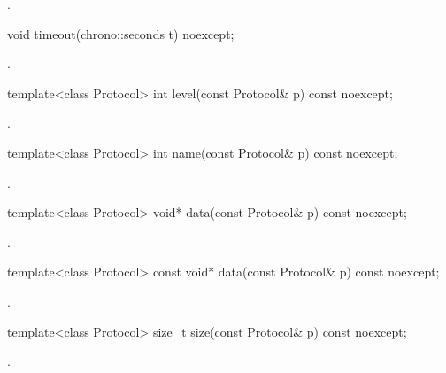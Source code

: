 \begin{itemdescr}
\pnum
\returns {}.
\end{itemdescr}

\begin{itemdecl}
void timeout(chrono::seconds t) noexcept;
\end{itemdecl}

\begin{itemdescr}
\pnum
\postconditions {}.
\end{itemdescr}

\begin{itemdecl}
template<class Protocol> int level(const Protocol& p) const noexcept;
\end{itemdecl}

\begin{itemdescr}
\pnum
\returns {}.
\end{itemdescr}

\begin{itemdecl}
template<class Protocol> int name(const Protocol& p) const noexcept;
\end{itemdecl}

\begin{itemdescr}
\pnum
\returns {}.
\end{itemdescr}

\begin{itemdecl}
template<class Protocol> void* data(const Protocol& p) const noexcept;
\end{itemdecl}

\begin{itemdescr}
\pnum
\returns {}.
\end{itemdescr}

\begin{itemdecl}
template<class Protocol> const void* data(const Protocol& p) const noexcept;
\end{itemdecl}

\begin{itemdescr}
\pnum
\returns {}.
\end{itemdescr}

\begin{itemdecl}
template<class Protocol> size_t size(const Protocol& p) const noexcept;
\end{itemdecl}

\begin{itemdescr}
\pnum
\returns {}.
\end{itemdescr}

